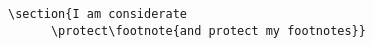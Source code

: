 \begin{code}
\verb|\section{I am considerate|\\
\verb|      \protect\footnote{and protect my footnotes}}|
\end{code}

